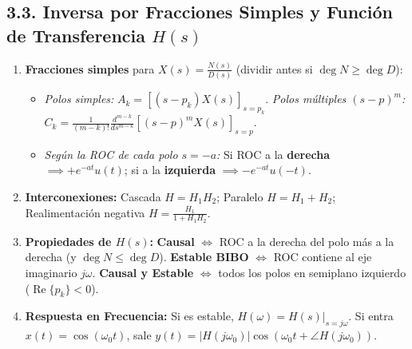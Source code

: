 \documentclass[10pt,a4paper]{article}
\begin{document}
	\subsection*{3.3. Inversa por Fracciones Simples y Función de Transferencia $H(s)$}
	\begin{enumerate}
		\item \textbf{Fracciones simples} para $X(s) = \frac{N(s)}{D(s)}$ (dividir antes si $\deg N \ge \deg D$):
		\begin{itemize}
			\item \emph{Polos simples:} $A_k = \left[(s-p_k)X(s)\right]_{s=p_k}$. \quad \emph{Polos múltiples $(s-p)^m$:} $C_k = \frac{1}{(m-k)!}\frac{d^{m-k}}{ds^{m-k}}\left[(s-p)^m X(s)\right]_{s=p}$.
			\item \emph{Según la ROC de cada polo $s=-a$:} Si ROC a la \textbf{derecha} $\implies +e^{-at}u(t)$; si a la \textbf{izquierda} $\implies -e^{-at}u(-t)$.
		\end{itemize}
		\item \textbf{Interconexiones:} Cascada $H = H_1 H_2$; \quad Paralelo $H = H_1 + H_2$; \quad Realimentación negativa $H = \frac{H_1}{1 + H_1 H_2}$.
		\item \textbf{Propiedades de $H(s)$:} \textbf{Causal} $\iff$ ROC a la derecha del polo más a la derecha (y $\deg N \le \deg D$). \textbf{Estable BIBO} $\iff$ ROC contiene al eje imaginario $j\omega$. \textbf{Causal y Estable} $\iff$ todos los polos en semiplano izquierdo ($\operatorname{Re}\{p_k\} < 0$).
		\item \textbf{Respuesta en Frecuencia:} Si es estable, $H(\omega) = H(s)|_{s=j\omega}$. Si entra $x(t) = \cos(\omega_0 t)$, sale $y(t) = |H(j\omega_0)|\cos(\omega_0 t + \angle H(j\omega_0))$.
	\end{enumerate}
	
\end{document}
